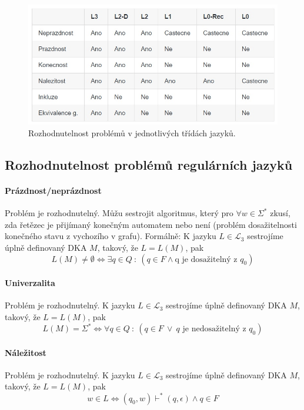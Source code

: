 \begin{figure}[H]
    \centering
    \includegraphics[width=1\linewidth]{rozhodnutelnost_jazyku.png}
    \caption{Rozhodnutelnost problémů v jednotlivých třídách jazyků.}
\end{figure}

\subsection{Rozhodnutelnost problémů regulárních jazyků}

\paragraph*{Prázdnost/neprázdnost} Problém je rozhodnutelný. Můžu sestrojit algoritmus, který pro $\forall w \in \Sigma^*$ zkusí, zda řetězec je přijímaný konečným automatem nebo není (problém dosažitelnosti konečného stavu z vychozího v grafu). Formálně: K jazyku $L \in \mathcal{L}_3$ sestrojíme úplně definovaný DKA $M$, takový, že $L = L(M)$, pak $$ L(M) \not= \emptyset \Leftrightarrow \exists q \in Q ~:~ (q \in F \land \text{q je dosažitelný z } q_0)$$

\paragraph*{Univerzalita} Problém je rozhodnutelný. K jazyku $L \in \mathcal{L}_3$ sestrojíme úplně definovaný DKA $M$, takový, že $L = L(M)$, pak $$ L(M) = \Sigma^* \Leftrightarrow \forall q \in Q ~:~ (q \in F ~\lor~ q \text{ je nedosažitelný z } q_0 )$$

\paragraph*{Náležitost} Problém je rozhodnutelný. K jazyku $L \in \mathcal{L}_3$ sestrojíme úplně definovaný DKA $M$, takový, že $L = L(M)$, pak $$ w \in L \Leftrightarrow (q_0, w) \vdash^* (q, \epsilon) \land q \in F $$

